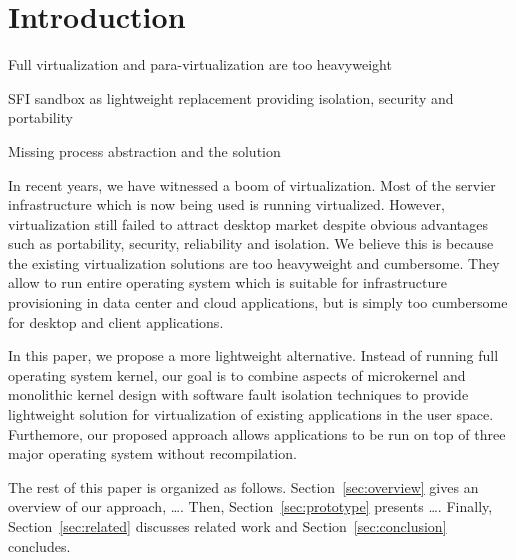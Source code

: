 \section{Introduction}
\label{sec:intro}

\begin{structure}
  \item Full virtualization and para-virtualization are too heavyweight
  \item SFI sandbox as lightweight replacement providing isolation,
    security and portability
  \item Missing process abstraction and the solution
\end{structure}

In recent years, we have witnessed a boom of virtualization. Most of the
servier infrastructure which is now being used is running virtualized.
However, virtualization still failed to attract desktop market despite
obvious advantages such as portability, security, reliability and
isolation. We believe this is because the existing virtualization
solutions are too heavyweight and cumbersome. They allow to run entire
operating system which is suitable for infrastructure provisioning in
data center and cloud applications, but is simply too cumbersome for
desktop and client applications.

In this paper, we propose a more lightweight alternative. Instead of
running full operating system kernel, our goal is to combine aspects of
microkernel and monolithic kernel design with software fault isolation
techniques to provide lightweight solution for virtualization of
existing applications in the user space.  Furthemore, our proposed
approach allows applications to be run on top of three major operating
system without recompilation.

The rest of this paper is organized as follows.
Section~\ref{sec:overview} gives an overview of our approach, \ldots.
Then, Section~\ref{sec:prototype} presents \ldots. Finally,
Section~\ref{sec:related} discusses related work and
Section~\ref{sec:conclusion} concludes.

